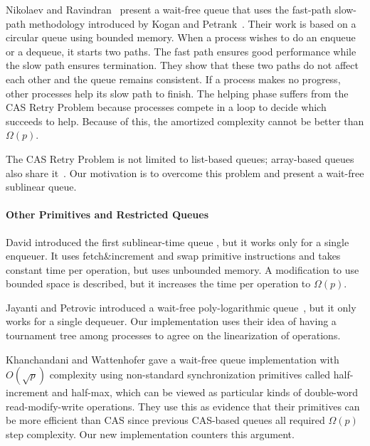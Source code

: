 Nikolaev and Ravindran~\cite{10.1145/3490148.3538572} present a
wait-free queue that uses the fast-path slow-path methodology
introduced by Kogan and Petrank~\cite{10.1145/2370036.2145835}. Their
work is based on a circular queue using bounded memory. When a process
wishes to do an enqueue or a dequeue, it starts two paths. The fast
path  ensures good performance while the slow path ensures
termination. They show that these two paths do not affect each other
and the queue remains consistent. If a process makes no progress,
other processes help its slow path to finish. The helping phase
suffers from the CAS Retry Problem because processes compete in a
 loop to decide which succeeds to help. Because of this, the
amortized complexity cannot be better than $\Omega(p)$. 

The CAS Retry Problem is not limited to list-based queues; array-based
queues also share
it~\cite{DBLP:conf/iceccs/ColvinG05,DBLP:conf/icdcn/Shafiei09,DBLP:conf/spaa/TsigasZ01}.
Our motivation is to overcome this problem and present a wait-free
sublinear queue. 

\paragraph{Other Primitives and Restricted Queues}

David introduced the first sublinear-time queue
\cite{DBLP:conf/wdag/David04}, but it works only for a single enqueuer.
It uses fetch\&increment and swap primitive instructions and takes constant time per operation, but
uses unbounded memory.  A modification to use bounded space
is described, but it increases the time per operation to $\Omega(p)$.

Jayanti and Petrovic introduced a wait-free poly-logarithmic
queue~\cite{DBLP:conf/fsttcs/JayantiP05}, but it only works for a single dequeuer. 
Our implementation uses their idea of having
a tournament tree among processes to agree on the linearization of
operations.

Khanchandani and Wattenhofer \cite{KW18} gave a wait-free queue implementation
with $O(\sqrt{p})$ complexity using non-standard synchronization primitives
called half-increment and half-max, which can be viewed as particular kinds of
double-word read-modify-write operations.
They use this as evidence that their primitives can be more efficient than CAS
since previous CAS-based queues all required $\Omega(p)$ step complexity.
Our new implementation counters this argument.


